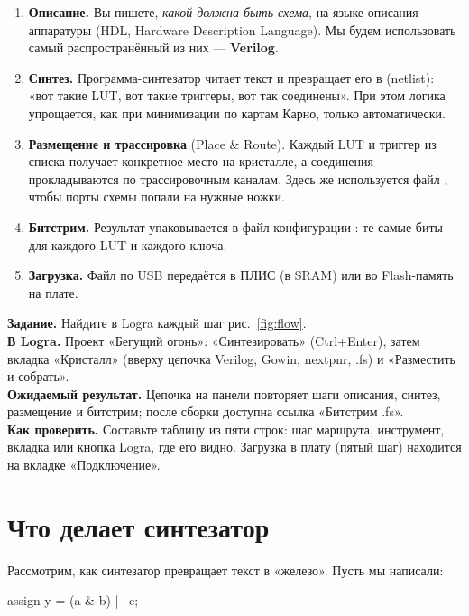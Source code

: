 \begin{enumerate}
  \item \textbf{Описание.} Вы пишете, \emph{какой должна быть схема}, на языке
        описания аппаратуры (HDL, Hardware Description Language). Мы будем
        использовать самый распространённый из них --- \textbf{Verilog}.
  \item \textbf{Синтез.} Программа-синтезатор читает текст и превращает его в
         (netlist): «вот такие LUT, вот такие триггеры,
        вот так соединены». При этом логика упрощается, как при минимизации
        по картам Карно, только автоматически.
  \item \textbf{Размещение и трассировка} (Place \& Route). Каждый LUT и
        триггер из списка получает конкретное место на кристалле, а соединения
        прокладываются по трассировочным каналам. Здесь же используется файл
        , чтобы порты схемы попали на нужные ножки.
  \item \textbf{Битстрим.} Результат упаковывается в файл конфигурации
        : те самые биты для каждого LUT и каждого ключа.
  \item \textbf{Загрузка.} Файл по USB передаётся в ПЛИС (в SRAM) или во
        Flash-память на плате.
\end{enumerate}

\begin{diybox}
\textbf{Задание.} Найдите в Logra каждый шаг рис.~\ref{fig:flow}.\\
\textbf{В Logra.} Проект «Бегущий огонь»: «Синтезировать» (Ctrl+Enter), затем вкладка «Кристалл» (вверху цепочка Verilog, Gowin, nextpnr, .fs) и «Разместить и собрать».\\
\textbf{Ожидаемый результат.} Цепочка на панели повторяет шаги описания, синтез, размещение и битстрим; после сборки доступна ссылка «Битстрим .fs».\\
\textbf{Как проверить.} Составьте таблицу из пяти строк: шаг маршрута, инструмент, вкладка или кнопка Logra, где его видно. Загрузка в плату (пятый шаг) находится на вкладке «Подключение».
\end{diybox}

\section{Что делает синтезатор}

Рассмотрим, как синтезатор превращает текст в «железо». Пусть мы написали:
\begin{vcode}
assign y = (a & b) | ~c;
\end{vcode}

